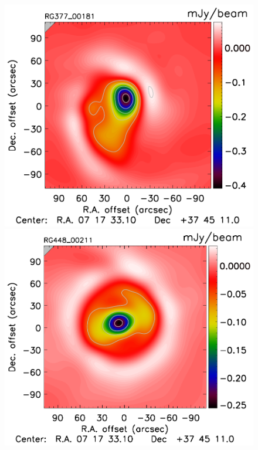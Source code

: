 \documentclass[twocolumn,traditabstract]{aa}
\begin{document}
\begin{figure}[h]
\includegraphics[trim=0cm 0.7cm 0cm 0cm, clip=true, totalheight=3.6cm]{Figure/DoG_RG377_00181_Ymap_zobs0p5_regrid_15_15_45.pdf}
\includegraphics[trim=0cm 0.7cm 0cm 0cm, clip=true, totalheight=3.6cm]{Figure/DoG_RG448_00211_Ymap_zobs0p4_regrid_15_15_45.pdf}

\end{figure}
\end{document}
